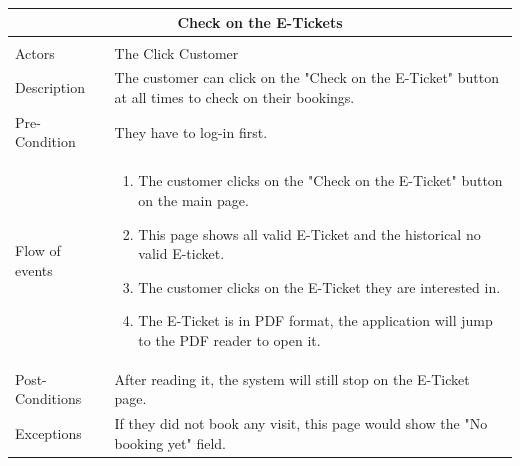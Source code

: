 \documentclass[a4paper,12pt]{report}
\begin{document}
\begin{center}
	\begin{tabular}{p{}|p{}}
		\multicolumn{2}{c}{\large \textbf{Check on the E-Tickets}} \\[3mm] 
		\hline \\
		Actors &  The Click Customer \\[3mm] 
		Description &  The customer can click on the "Check on the E-Ticket" button at all times to check on their bookings. \\[3mm]  
		Pre-Condition &  They have to log-in first.\\[3mm] 
		Flow of events & 
		\begin{enumerate}
			\item The customer clicks on the "Check on the E-Ticket" button on the main page.
			\item This page shows all valid E-Ticket and the historical no valid E-ticket.
			\item The customer clicks on the E-Ticket they are interested in.
			\item The E-Ticket is in PDF format, the application will jump to the PDF reader to open it.
		\end{enumerate}
		\\[3mm] 
		Post-Conditions & After reading it, the system will still stop on the E-Ticket page.
		\\[3mm] 
		Exceptions & If they did not book any visit,  this page would show the "No booking yet" field.\\[3mm] 
	\end{tabular}
\end{center}
\end{document}
